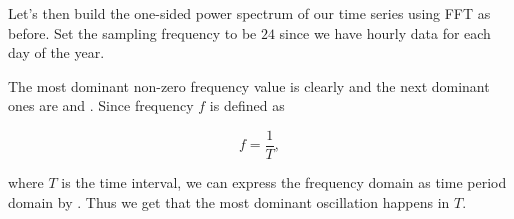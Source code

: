 \documentclass{article}
\begin{document}
  Let's then build the one-sided power spectrum of our time series using FFT as before. Set the sampling frequency to be $24$ since we have hourly data for each day of the year.
  
  The most dominant non-zero frequency value is clearly  and the next dominant ones are  and . Since frequency $f$ is defined as
  
  \[f = \dfrac{1}{T},\]
  
  where $T$ is the time interval, we can express the frequency domain as time period domain by   . Thus we get that the most dominant oscillation happens in  $T$.
\end{document}

